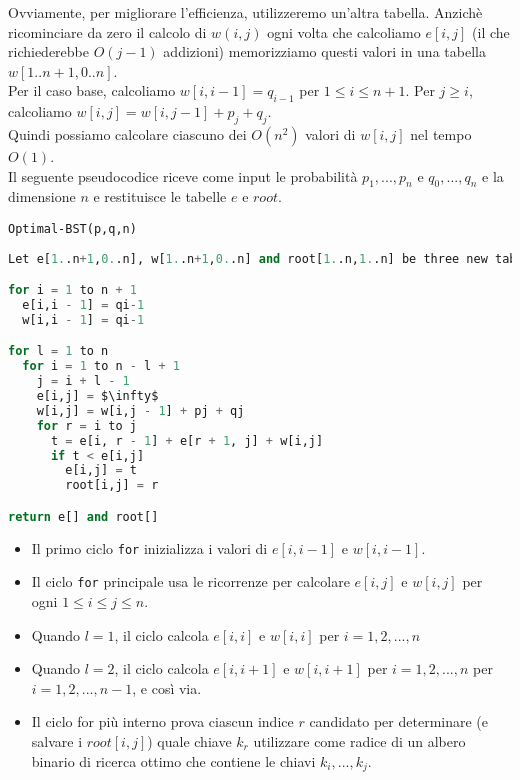 Ovviamente, per migliorare l'efficienza, utilizzeremo un'altra tabella.
Anzichè ricominciare da zero il calcolo di $w(i,j)$ ogni volta che
calcoliamo $e[i,j]$ (il che richiederebbe $O(j-1)$ addizioni)
memorizziamo questi valori in una tabella $w[1..n+1,0..n]$.\\
Per il caso base, calcoliamo $w[i, i-1] = q_{i-1}$ per $1 \le i \le n+1$.
Per $j \ge i$, calcoliamo $w[i,j] = w[i, j-1] + p_j + q_j$.\\

Quindi possiamo calcolare ciascuno dei $O(n^2)$ valori di $w[i,j]$
nel tempo $O(1)$.\\

Il seguente pseudocodice riceve come input le probabilità
$p_1, ..., p_n$ e $q_0, ..., q_n$ e la dimensione $n$ e
restituisce le tabelle $e$ e $root$.


\texttt{Optimal-BST(p,q,n)}

\begin{lstlisting}[language=Python, mathescape=true]
  Let e[1..n+1,0..n], w[1..n+1,0..n] and root[1..n,1..n] be three new table

for i = 1 to n + 1
  e[i,i - 1] = qi-1
  w[i,i - 1] = qi-1

for l = 1 to n
  for i = 1 to n - l + 1
    j = i + l - 1
    e[i,j] = $\infty$
    w[i,j] = w[i,j - 1] + pj + qj
    for r = i to j
      t = e[i, r - 1] + e[r + 1, j] + w[i,j]
      if t < e[i,j]
        e[i,j] = t
        root[i,j] = r

return e[] and root[]
\end{lstlisting}


\begin{itemize}
  \item
        Il primo ciclo \texttt{for} inizializza i valori di $e[i,i - 1]$ e
        $w[i,i - 1]$.
  \item
        Il ciclo \texttt{for} principale usa le ricorrenze per calcolare
        $e[i,j]$ e $w[i,j]$ per ogni $1 \le i \le j \le n$.
  \item
        Quando $l = 1$, il ciclo calcola $e[i,i]$ e $w[i,i]$ per
        $i = 1, 2, ..., n$
  \item
        Quando $l = 2$, il ciclo calcola $e[i,i+1]$ e $w[i,i+1]$ per
        $i = 1, 2, ..., n$ per $i = 1, 2, ..., n-1$, e così via.
  \item
        Il ciclo for più interno prova ciascun indice $r$ candidato per
        determinare (e salvare i $root[i,j]$) quale chiave $k_r$
        utilizzare come radice di un albero binario di ricerca ottimo che
        contiene le chiavi $k_i, ..., k_j$.
\end{itemize}


